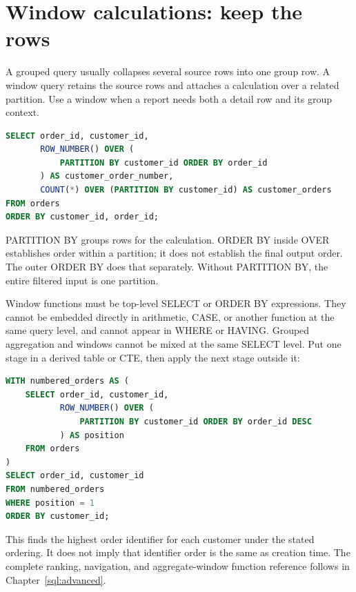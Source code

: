 \section{Window calculations: keep the rows}

A grouped query usually collapses several source rows into one group row. A window query retains the source rows and attaches a calculation over a related partition. Use a window when a report needs both a detail row and its group context.

\begin{lstlisting}[language=SQL]
SELECT order_id, customer_id,
       ROW_NUMBER() OVER (
           PARTITION BY customer_id ORDER BY order_id
       ) AS customer_order_number,
       COUNT(*) OVER (PARTITION BY customer_id) AS customer_orders
FROM orders
ORDER BY customer_id, order_id;
\end{lstlisting}

PARTITION BY groups rows for the calculation. ORDER BY inside OVER establishes order within a partition; it does not establish the final output order. The outer ORDER BY does that separately. Without PARTITION BY, the entire filtered input is one partition.


Window functions must be top-level SELECT or ORDER BY expressions. They cannot be embedded directly in arithmetic, CASE, or another function at the same query level, and cannot appear in WHERE or HAVING. Grouped aggregation and windows cannot be mixed at the same SELECT level. Put one stage in a derived table or CTE, then apply the next stage outside it:

\begin{lstlisting}[language=SQL]
WITH numbered_orders AS (
    SELECT order_id, customer_id,
           ROW_NUMBER() OVER (
               PARTITION BY customer_id ORDER BY order_id DESC
           ) AS position
    FROM orders
)
SELECT order_id, customer_id
FROM numbered_orders
WHERE position = 1
ORDER BY customer_id;
\end{lstlisting}

This finds the highest order identifier for each customer under the stated ordering. It does not imply that identifier order is the same as creation time. The complete ranking, navigation, and aggregate-window function reference follows in Chapter~\ref{sql:advanced}.

